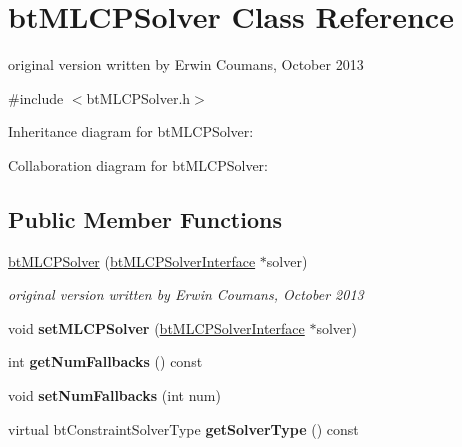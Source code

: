 \hypertarget{classbt_m_l_c_p_solver}{\section{bt\+M\+L\+C\+P\+Solver Class Reference}
\label{classbt_m_l_c_p_solver}
}


original version written by Erwin Coumans, October 2013  




{\ttfamily \#include $<$bt\+M\+L\+C\+P\+Solver.\+h$>$}



Inheritance diagram for bt\+M\+L\+C\+P\+Solver\+:


Collaboration diagram for bt\+M\+L\+C\+P\+Solver\+:
\subsection*{Public Member Functions}
\begin{DoxyCompactItemize}
\item 
\hypertarget{classbt_m_l_c_p_solver_ac699f0a59f0b730ac39658ee2903b042}{\hyperlink{classbt_m_l_c_p_solver_ac699f0a59f0b730ac39658ee2903b042}{bt\+M\+L\+C\+P\+Solver} (\hyperlink{classbt_m_l_c_p_solver_interface}{bt\+M\+L\+C\+P\+Solver\+Interface} $\ast$solver)}\label{classbt_m_l_c_p_solver_ac699f0a59f0b730ac39658ee2903b042}

\begin{DoxyCompactList}\small\item\em original version written by Erwin Coumans, October 2013 \end{DoxyCompactList}\item 
\hypertarget{classbt_m_l_c_p_solver_af5a0ef252391a313ba85f871b47710b0}{void {\bfseries set\+M\+L\+C\+P\+Solver} (\hyperlink{classbt_m_l_c_p_solver_interface}{bt\+M\+L\+C\+P\+Solver\+Interface} $\ast$solver)}\label{classbt_m_l_c_p_solver_af5a0ef252391a313ba85f871b47710b0}

\item 
\hypertarget{classbt_m_l_c_p_solver_a6c80a4bec4a89e773993639efd12f232}{int {\bfseries get\+Num\+Fallbacks} () const }\label{classbt_m_l_c_p_solver_a6c80a4bec4a89e773993639efd12f232}

\item 
\hypertarget{classbt_m_l_c_p_solver_ada02127142fb8e8028833d73a9341bfa}{void {\bfseries set\+Num\+Fallbacks} (int num)}\label{classbt_m_l_c_p_solver_ada02127142fb8e8028833d73a9341bfa}

\item 
\hypertarget{classbt_m_l_c_p_solver_acf0c4a013a9ac112e04ac0ff5a6827b3}{virtual bt\+Constraint\+Solver\+Type {\bfseries get\+Solver\+Type} () const }\label{classbt_m_l_c_p_solver_acf0c4a013a9ac112e04ac0ff5a6827b3}

\end{DoxyCompactItemize}

